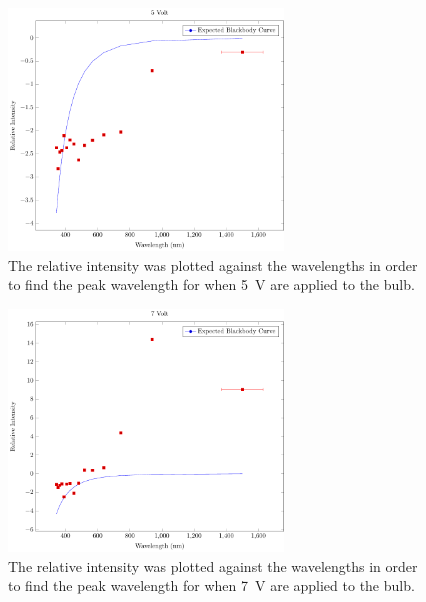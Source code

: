 \documentclass[a4paper]{article}
\begin{document}
\begin{figure}[H]
  \begin{center}
    \includegraphics[width=0.65\textwidth]{P6-BlackbodyRadiation/Plots/5Volt/5volt.pdf}
  \end{center}
  \label{gph:5volt}
  \caption{The relative intensity was plotted against the wavelengths in order
    to find the peak wavelength for when \SI{5}{\volt} are applied to the bulb.}
\end{figure}

\begin{figure}[H]
  \begin{center}
    \includegraphics[width=0.65\textwidth]{P6-BlackbodyRadiation/Plots/7Volt/7volt.pdf}
  \end{center}
  \label{gph:7volt}
  \caption{The relative intensity was plotted against the wavelengths in order
    to find the peak wavelength for when \SI{7}{\volt} are applied to the bulb.}
\end{figure}
\end{document}
